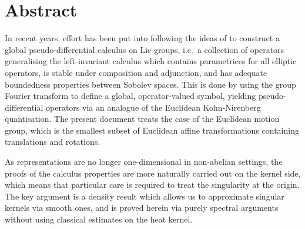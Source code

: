 \chapter*{Abstract}

In recent years,
effort has been put into following the ideas of \citeauthor{RuzhanskyTurunen10}
to construct a global pseudo-differential calculus on Lie groups,
i.e.\ a collection of operators generalising the left-invariant calculus
which contains parametrices for all elliptic operators,
is stable under composition and adjunction,
and has adequate boundedness properties between Sobolev spaces.
This is done by using the group Fourier transform to define a global, operator-valued symbol,
yielding pseudo-differential operators via an analogue of the Euclidean Kohn-Nirenberg quantisation.
The present document treats the case of the Euclidean motion group,
which is the smallest subset of Euclidean affine transformations containing translations and rotations.

As representations are no longer one-dimensional in non-abelian settings,
the proofs of the calculus properties are more naturally carried out on the kernel side,
which means that particular care is required to treat the singularity at the origin.
The key argument is a density result which allows us to approximate singular kernels via smooth ones,
and is proved herein via purely spectral arguments without using classical estimates on the heat kernel.
